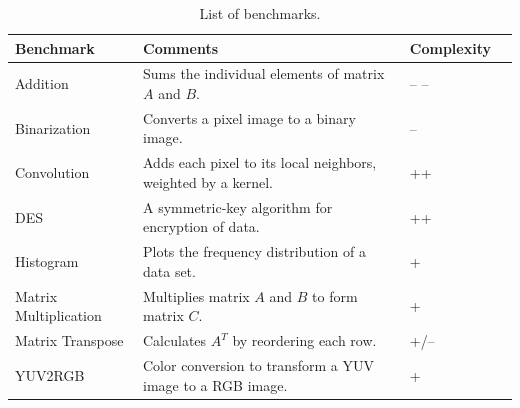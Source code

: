 \begin{table}[H]
\caption{List of benchmarks.}
\begin{center}
\begin{tabular}{@{}l l l l@{}}
\toprule
\textbf{Benchmark} 	& \textbf{Comments} & \hspace{-30px}\textbf{Complexity}	 		\\ \hline
Addition			& Sums the individual elements of matrix $A$ and $B$.	& -- --\\
Binarization		& Converts a pixel image to a binary image. 			& --\\
Convolution		& Adds each pixel to its local neighbors, weighted by a kernel. & ++\\
DES				& A symmetric-key algorithm for encryption of data. 		& ++	\\
Histogram			& Plots the frequency distribution of a data set. 			& +\\
Matrix Multiplication	& Multiplies matrix $A$ and $B$ to form matrix $C$. 		& +\\
Matrix Transpose	& Calculates $A^T$ by reordering each row.			& +/--\\
YUV2RGB		& Color conversion to transform a YUV image to a RGB image.	& +\\
\bottomrule
\end{tabular}
\end{center}
\label{table:benchmarks_overview}
\end{table}%

\newpage

